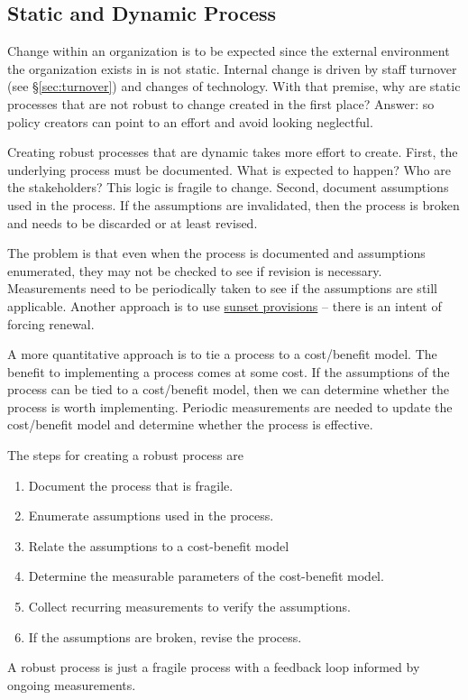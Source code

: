 \subsection{Static and Dynamic Process\label{sec:static-dynamic_processes}}


Change within an organization is to be expected since the external environment the organization exists in is not static. Internal change is driven by staff turnover (see \S\ref{sec:turnover}) and changes of technology. With that premise, why are static processes that are not robust to change created in the first place? Answer: so policy creators can point to an effort and avoid looking neglectful.

Creating robust processes that are dynamic takes more effort to create. First, the underlying process must be documented. What is expected to happen? Who are the stakeholders? This logic is fragile to change. Second, document assumptions used in the process. If the assumptions are invalidated, then the process is broken and needs to be discarded or at least revised. 

The problem is that even when the process is documented and assumptions enumerated, they may not be checked to see if revision is necessary. Measurements need to be periodically taken to see if the assumptions are still applicable. Another approach is to use \href{https://en.wikipedia.org/wiki/Sunset_provision}{sunset provisions} -- there is an intent of forcing renewal. 

A more quantitative approach is to tie a process to a cost/benefit model. The benefit to implementing a process comes at some cost. If the assumptions of the process can be tied to a cost/benefit model, then we can determine whether the process is worth implementing. Periodic measurements are needed to update the cost/benefit model and determine whether the process is effective.

The steps for creating a robust process are
\begin{enumerate}
    \item Document the process that is fragile.
    \item Enumerate assumptions used in the process. 
    \item Relate the assumptions to a cost-benefit model
    \item Determine the measurable parameters of the cost-benefit model. 
    \item Collect recurring measurements to verify the assumptions. 
    \item If the assumptions are broken, revise the process. 
\end{enumerate}
A robust process is just a fragile process with a feedback loop informed by ongoing measurements. 